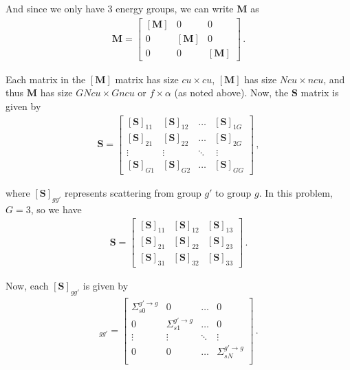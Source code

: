 \documentclass[10pt]{article}
\begin{document}
And since we only have 3 energy groups, we can write $\textbf{M}$ as
\begin{align*}
\textbf{M} = 
\begin{bmatrix}
    [\textbf{M}] & 0 & 0  \\
    0 & [\textbf{M}] & 0  \\
    0 & 0 & [\textbf{M}]
\end{bmatrix}\,.
\end{align*}

Each matrix in the $[\textbf{M}]$ matrix has size $cu \times cu$, $[\textbf{M}]$ has size $Ncu \times ncu$, and thus $\textbf{M}$ has size $GNcu \times Gncu$ or $f \times \alpha$ (as noted above). Now, the $\textbf{S}$ matrix is given by\
%
\begin{align*}
\textbf{S} = 
\begin{bmatrix}
    [\textbf{S}]_{11} & [\textbf{S}]_{12} & \dots & [\textbf{S}]_{1G}  \\
    [\textbf{S}]_{21} & [\textbf{S}]_{22} & \dots & [\textbf{S}]_{2G}  \\
   \vdots & \vdots & \ddots & \ \vdots \\
    [\textbf{S}]_{G1} & [\textbf{S}]_{G2} & \dots & [\textbf{S}]_{GG} 
\end{bmatrix}\,,
\end{align*}

where $[\textbf{S}]_{gg'}$ represents scattering from group $g'$ to group $g$. In this problem, $G=3$, so we have 
%
\begin{align*}
\textbf{S} = 
\begin{bmatrix}
    [\textbf{S}]_{11} & [\textbf{S}]_{12}  & [\textbf{S}]_{13}  \\
    [\textbf{S}]_{21} & [\textbf{S}]_{22}  & [\textbf{S}]_{23}  \\
    [\textbf{S}]_{31} & [\textbf{S}]_{32}  & [\textbf{S}]_{33} 
\end{bmatrix}\,.
\end{align*}

Now, each $[\textbf{S}]_{gg'}$ is given by
%
\begin{align*}
[\textbf{S}]_{gg'} = 
\begin{bmatrix}
	\Sigma_{s0}^{g' \rightarrow g} & 0 & \dots & 0 \\
	0 & \Sigma_{s1}^{g' \rightarrow g}  & \dots & 0 \\
	\vdots & \vdots & \ddots & \vdots \\
	0 & 0 & \dots & \Sigma_{sN}^{g' \rightarrow g}  \\
\end{bmatrix}\,.
\end{align*}
\end{document}
